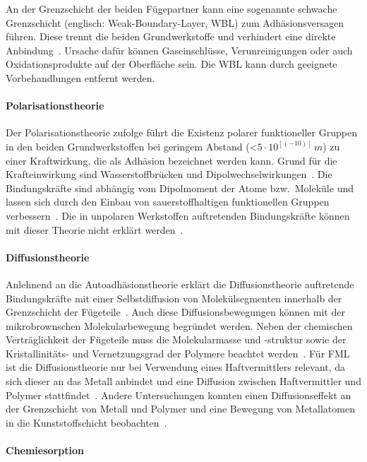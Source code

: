 An der Grenzschicht der beiden Fügepartner kann eine sogenannte schwache Grenzschicht (englisch: Weak-Boundary-Layer, WBL) zum Adhäsionsversagen führen.
Diese trennt die beiden Grundwerkstoffe und verhindert eine direkte Anbindung~\cite{Schroeer1994}.
Ursache dafür können Gaseinschlüsse, Verunreinigungen oder auch Oxidationsprodukte auf der Oberfläche sein.
Die WBL kann durch geeignete Vorbehandlungen entfernt werden\cite{Flock2012}.

\paragraph{Polarisationstheorie}

Der Polarisationstheorie zufolge führt die Existenz polarer funktioneller Gruppen in den beiden Grundwerkstoffen bei geringem Abstand (<$5\cdot10^[(-10)] \, m$) zu einer Kraftwirkung, die als Adhäsion bezeichnet werden kann.
Grund für die Krafteinwirkung sind Wasserstoffbrücken und Dipolwechselwirkungen~\cite{Weiss2002}.
Die Bindungskräfte sind abhängig vom Dipolmoment der Atome bzw.\ Moleküle und lassen sich durch den Einbau von sauerstoffhaltigen funktionellen Gruppen verbessern~\cite{Garbassi1998}.
Die in unpolaren Werkstoffen auftretenden Bindungskräfte können mit dieser Theorie nicht erklärt werden~\cite{Habenicht2009}.

\paragraph{Diffusionstheorie}

Anlehnend an die Autoadhäsionstheorie erklärt die Diffusionstheorie auftretende Bindungskräfte mit einer Selbstdiffusion von Molekülsegmenten innerhalb der Grenzschicht der Fügeteile~\cite{Gromov1963}.
Auch diese Diffusionsbewegungen können mit der mikrobrownschen Molekularbewegung begründet werden.
Neben der chemischen Verträglichkeit der Fügeteile muss die Molekularmasse und -struktur sowie der Kristallinitäts- und Vernetzungsgrad der Polymere beachtet werden~\cite{Habenicht2009}.
Für FML ist die Diffusionstheorie nur bei Verwendung eines Haftvermittlers relevant,  da sich dieser an das Metall anbindet und eine Diffusion zwischen Haftvermittler und Polymer stattfindet~\cite{Suchentrunk2007}.
Andere Untersuchungen konnten einen Diffusionseffekt an der Grenzschicht von Metall und Polymer und eine Bewegung von Metallatomen in die Kunststoffschicht beobachten~\cite{Faupel2003}.

\paragraph{Chemiesorption}

